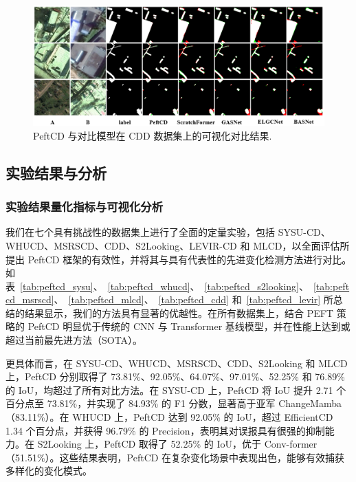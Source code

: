 \begin{figure}[!htbp]
  \centering
  \includegraphics[width=\textwidth]{paper_figures/基于AI基础模型微调的变化检测模型研究/PeftCD/peftcd_cdd.png}
  \caption{PeftCD 与对比模型在 CDD 数据集上的可视化对比结果.}
  \label{fig:peftcd_cdd}
\end{figure}

\subsection{实验结果与分析}
\subsubsection{实验结果量化指标与可视化分析}

我们在七个具有挑战性的数据集上进行了全面的定量实验，包括 SYSU-CD、WHUCD、MSRSCD、CDD、S2Looking、LEVIR-CD 和 MLCD，以全面评估所提出 PeftCD 框架的有效性，并将其与具有代表性的先进变化检测方法进行对比。如表~\ref{tab:peftcd_sysu}、~\ref{tab:peftcd_whucd}、~\ref{tab:peftcd_s2looking}、~\ref{tab:peftcd_msrscd}、~\ref{tab:peftcd_mlcd}、~\ref{tab:peftcd_cdd} 和~\ref{tab:peftcd_levir} 所总结的结果显示，我们的方法具有显著的优越性。在所有数据集上，结合 PEFT 策略的 PeftCD 明显优于传统的 CNN 与 Transformer 基线模型，并在性能上达到或超过当前最先进方法（SOTA）。  

更具体而言，在 SYSU-CD、WHUCD、MSRSCD、CDD、S2Looking 和 MLCD 上，PeftCD 分别取得了 73.81\%、92.05\%、64.07\%、97.01\%、52.25\% 和 76.89\% 的 IoU，均超过了所有对比方法。在 SYSU-CD 上，PeftCD 将 IoU 提升 2.71 个百分点至 73.81\%，并实现了 84.93\% 的 F1 分数，显著高于亚军 ChangeMamba（83.11\%）。在 WHUCD 上，PeftCD 达到 92.05\% 的 IoU，超过 EfficientCD 1.34 个百分点，并获得 96.79\% 的 Precision，表明其对误报具有很强的抑制能力。在 S2Looking 上，PeftCD 取得了 52.25\% 的 IoU，优于 Conv-former（51.51\%）。这些结果表明，PeftCD 在复杂变化场景中表现出色，能够有效捕获多样化的变化模式。  



